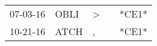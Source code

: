 \begin{supertabular}{lllll}
 07-03-16 &  OBLI &  \textgreater &   &  *CE1* \\
 10-21-16 &  ATCH &             , &   &  *CE1* \\
\end{supertabular}
